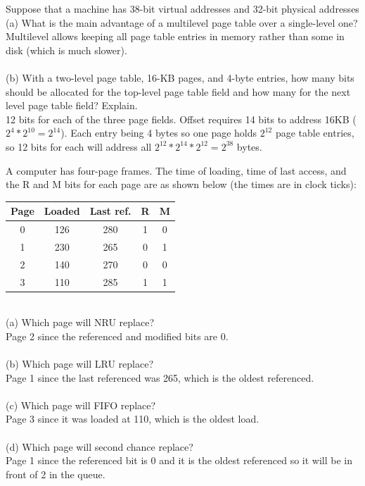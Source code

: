 \documentclass[12pt]{article}
\newenvironment{problem}[2][Problem]{\begin{trivlist}
\item[\hskip \labelsep {\bfseries #1}\hskip \labelsep {\bfseries #2.}]}{\end{trivlist}}
\begin{document}
\begin{problem}{2}
  Suppose that a machine has 38-bit virtual addresses and 32-bit physical addresses\\
  (a) What is the main advantage of a multilevel page table over a single-level one?\\
  Multilevel allows keeping all page table entries in memory rather than some in disk (which is much slower).\\\\
  (b) With a two-level page table, 16-KB pages, and 4-byte entries, how many bits should be allocated
  for the top-level page table field and how many for the next level page table field? Explain.\\
  12 bits for each of the three page fields. Offset requires 14 bits to address 16KB ($2^4*2^{10} = 2^{14}$). Each entry being 4 bytes so one page holds $2^{12}$ page table entries, so 12 bits for each will address all $2^{12}*2^{14}*2^{12}=2^{38}$ bytes.
\end{problem}
\pagebreak
\begin{problem}{3}
  A computer has four-page frames. The time of loading, time of last access,
and the R and M bits for each page are as shown below (the times are in clock ticks):
\begin{tabular}{|c c c c c|} 
  \hline
  Page & Loaded & Last ref. & R & M\\
  \hline
  0 & 126 & 280 & 1 & 0\\
  1 & 230 & 265 & 0 & 1\\
  2 & 140 & 270 & 0 & 0\\
  3 & 110 & 285 & 1 & 1\\
  \hline
 \end{tabular}
 \\(a) Which page will NRU replace?\\
 Page 2 since the referenced and modified bits are 0.\\\\
 (b) Which page will LRU replace?\\
 Page 1 since the last referenced was 265, which is the oldest referenced.\\\\
 (c) Which page will FIFO replace?\\
 Page 3 since it was loaded at 110, which is the oldest load.\\\\
 (d) Which page will second chance replace?\\
 Page 1 since the referenced bit is 0 and it is the oldest referenced so it will be in front of 2 in the queue.
\end{problem}
\end{document}

